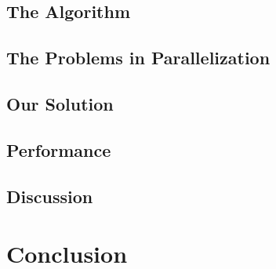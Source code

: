 \documentclass[english, 12pt]{article} \usepackage[T1]{fontenc}
\begin{document}
\subsection{The Algorithm}


\subsection{The Problems in Parallelization}


\subsection{Our Solution}


\subsection{Performance}


\subsection{Discussion}


\section{Conclusion} 




\end{document}
